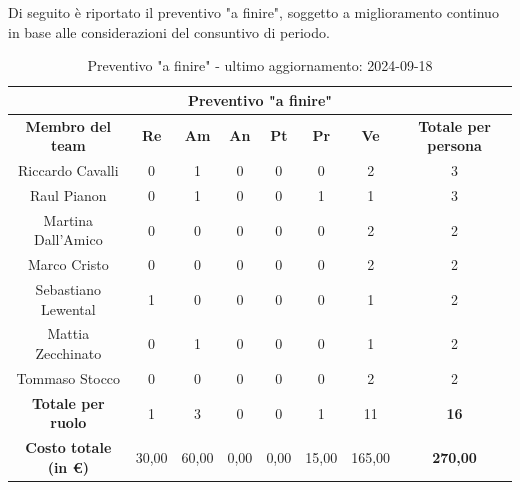 \begin{minipage}{\textwidth}
Di seguito è riportato il preventivo "a finire", soggetto a miglioramento continuo in base alle considerazioni del consuntivo di periodo.
\begin{table}[H]
  \centering
  \begin{adjustbox}{max width=\textwidth}
  \begin{tabular}{|c|c|c|c|c|c|c|c|}
    \hline
    \multicolumn{8}{|c|}{\textbf{Preventivo "a finire"}} \\
    \hline
    \textbf{Membro del team} & \textbf{Re} & \textbf{Am} & \textbf{An} & \textbf{Pt} & \textbf{Pr} & \textbf{Ve} & \textbf{Totale per persona} \\
    \hline
    Riccardo Cavalli & 0 & 1 & 0 & 0 & 0 & 2 & 3 \\
    \hline
    Raul Pianon & 0 & 1 & 0 & 0 & 1 & 1 & 3 \\
    \hline
    Martina Dall'Amico & 0 & 0 & 0 & 0 & 0 & 2 & 2 \\
    \hline
    Marco Cristo & 0 & 0 & 0 & 0 & 0 & 2 & 2 \\
    \hline
    Sebastiano Lewental & 1 & 0 & 0 & 0 & 0 & 1 & 2 \\
    \hline
    Mattia Zecchinato & 0 & 1 & 0 & 0 & 0 & 1 & 2 \\
    \hline
    Tommaso Stocco & 0 & 0 & 0 & 0 & 0 & 2 & 2 \\
    \hline
    \textbf{Totale per ruolo} & 1 & 3 & 0 & 0 & 1 & 11 & \textbf{16} \\
    \hline
    \textbf{Costo totale (in €)} & 30,00 & 60,00 & 0,00 & 0,00 & 15,00 & 165,00 & \textbf{270,00} \\
    \hline
  \end{tabular}
  \end{adjustbox}
  \caption{Preventivo "a finire" - ultimo aggiornamento: 2024-09-18}\label{tab:preventivo-a-finire}
\end{table}
\end{minipage}
